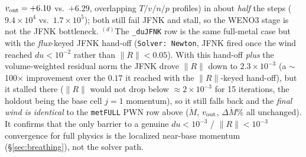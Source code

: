 \documentclass[english,a4paper]{my_memo}
\begin{document}
\begin{landscape}
\begin{table}[p]
{$v_{\rm out} = +6.10$ vs.\ $+6.29$, overlapping $T/v/n/p$ profiles) in about
\emph{half} the steps ($9.4\times10^4$ vs.\ $1.7\times10^5$); both still fail
JFNK and stall, so the WENO3 stage is not the JFNK bottleneck.
$^{(d)}$The \texttt{\_duJFNK} row is the same full-metal case but with the
\emph{flux}-keyed JFNK hand-off (\texttt{Solver: Newton}, JFNK fired once the
wind reached $du<10^{-2}$ rather than $\lVert R\rVert<0.05$). With this hand-off
\emph{plus} the volume-weighted residual norm the JFNK drove $\lVert R\rVert$ down
to $2.3\times10^{-3}$ (a $\sim$100$\times$ improvement over the $0.17$ it
reached with the $\lVert R\rVert$-keyed hand-off), but it stalled there
($\lVert R\rVert$ would not drop below $\approx2\times10^{-3}$ for 15 iterations,
the holdout being the base cell $j{=}1$ momentum), so it still falls back and the
\emph{final wind is identical} to the \texttt{metFULL} PWN row above ($\dot M$,
$v_{\rm out}$, $\Delta\dot M$\% all unchanged). It confirms that the only barrier
to a genuine $du<10^{-3}$ / $\lVert R\rVert<10^{-3}$ convergence for full physics
is the localized near-base momentum (\S\ref{sec:breathing}), not the solver path.}
\label{tab:bc-pres}
\end{table}
\end{landscape}
\end{document}
